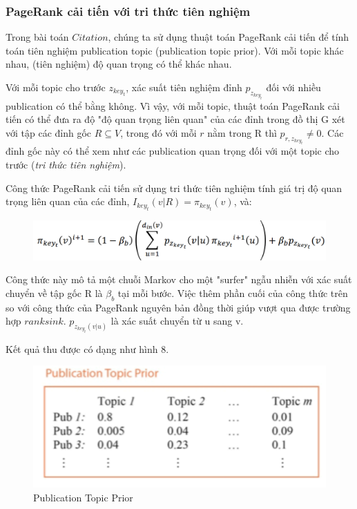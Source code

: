 \documentclass[12pt,a4paper]{article}
\begin{document}
\subsubsection{PageRank cải tiến với tri thức tiên nghiệm}
Trong bài toán $ Citation $, chúng ta sử dụng thuật toán PageRank cải tiến để tính toán tiên nghiệm publication topic (publication topic prior). Với mỗi topic khác nhau, (tiên nghiệm) độ quan trọng có thể khác nhau.

Với mỗi topic cho trước $ z_{key_{t}} $, xác suất tiên nghiệm đỉnh $ p_{z_{key_{t}}} $ đối với nhiều publication có thể bằng không. Vì vậy, với mỗi topic, thuật toán PageRank cải tiến có thể đưa ra độ "độ quan trọng liên quan" của các đỉnh trong đồ thị G xét với tập các đỉnh gốc $  R \subseteq V $, trong đó với mỗi $ r  $ nằm trong R thì $ p_{r, z_{key_{t}}} \neq 0 $. Các đỉnh gốc này có thể xem như các publication quan trọng đối với một topic cho trước (\textit{tri thức tiên nghiệm}). 

Công thức PageRank cải tiến sử dụng tri thức tiên nghiệm tính giá trị độ quan trọng liên quan của các đỉnh, $ I_{key_{t}}(v|R) = \pi_{key_{t}}(v) $, và:

\begin{figure}[h]
	\begin{center}
		\includegraphics[scale=0.4]{cong_thuc_pr} 
	\end{center}
\end{figure}

Công thức này mô tả một chuỗi Markov cho một "surfer" ngẫu nhiễn với xác suất chuyển về tập gốc R là $ \beta_{b} $ tại mỗi bước. Việc thêm phần cuối của công thức trên so với công thức của PageRank nguyên bản đồng thời giúp vượt qua được trường hợp $ rank sink $. $ p_{z_{key_{t}}(v|u)} $ là xác suất chuyển từ u sang v.

Kết quả thu được có dạng như hình 8.

\begin{figure}[h]
	\begin{center}
		\includegraphics[scale=0.4]{ket_qua_pr} 
		\caption{Publication Topic Prior}
	\end{center}
\end{figure}
\end{document}
